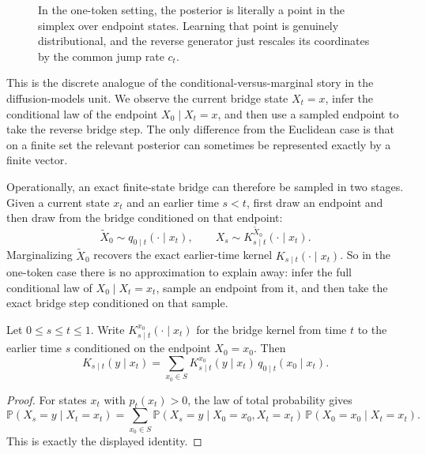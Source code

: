 \documentclass[11pt]{article}
\begin{document}
\begin{figure}[t]
  \centering
  
  \caption{In the one-token setting, the posterior is literally a point in the simplex over endpoint states.
  Learning that point is genuinely distributional, and the reverse generator just rescales its coordinates by the common jump rate \(c_t\).}
  \label{fig:one-token-distributional}
\end{figure}

This is the discrete analogue of the conditional-versus-marginal story in the diffusion-models unit.
We observe the current bridge state \(X_t=x\), infer the conditional law of the endpoint \(X_0\mid X_t=x\), and then use a sampled endpoint to take the reverse bridge step.
The only difference from the Euclidean case is that on a finite set the relevant posterior can sometimes be represented exactly by a finite vector.

Operationally, an exact finite-state bridge can therefore be sampled in two stages.
Given a current state \(x_t\) and an earlier time \(s<t\), first draw an endpoint and then draw from the bridge conditioned on that endpoint:
\[
  \tilde X_0\sim q_{0\mid t}(\cdot\mid x_t),
  \qquad
  X_s\sim K^{\tilde X_0}_{s\mid t}(\cdot\mid x_t).
\]
Marginalizing \(\tilde X_0\) recovers the exact earlier-time kernel \(K_{s\mid t}(\cdot\mid x_t)\).
So in the one-token case there is no approximation to explain away: infer the full conditional law of \(X_0\mid X_t=x_t\), sample an endpoint from it, and then take the exact bridge step conditioned on that sample.

\begin{proposition}
\label{prop:finite-state-kernel-marginalization}
Let \(0\le s\le t\le 1\).
Write \(K^{x_0}_{s\mid t}(\cdot\mid x_t)\) for the bridge kernel from time \(t\) to the earlier time \(s\) conditioned on the endpoint \(X_0=x_0\).
Then
\[
  K_{s\mid t}(y\mid x_t)
  =
  \sum_{x_0\in S}
  K^{x_0}_{s\mid t}(y\mid x_t)\,
  q_{0\mid t}(x_0\mid x_t).
\]
\end{proposition}
\begin{proof}
For states \(x_t\) with \(p_t(x_t)>0\), the law of total probability gives
\[
  \mathbb{P}(X_s=y\mid X_t=x_t)
  =
  \sum_{x_0\in S}
  \mathbb{P}(X_s=y\mid X_0=x_0,X_t=x_t)\,
  \mathbb{P}(X_0=x_0\mid X_t=x_t).
\]
This is exactly the displayed identity.%
\end{proof}
\end{document}
